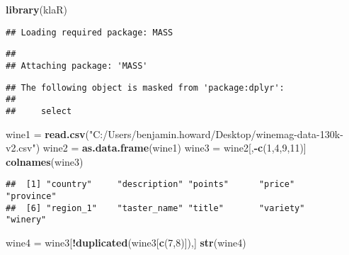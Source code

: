 \documentclass[
]{article}
\newenvironment{Shaded}{\begin{snugshade}}{\end{snugshade}}
\newcommand{\DecValTok}[1]{\textcolor[rgb]{0.00,0.00,0.81}{#1}}
\newcommand{\KeywordTok}[1]{\textcolor[rgb]{0.13,0.29,0.53}{\textbf{#1}}}
\newcommand{\NormalTok}[1]{#1}
\newcommand{\OperatorTok}[1]{\textcolor[rgb]{0.81,0.36,0.00}{\textbf{#1}}}
\newcommand{\StringTok}[1]{\textcolor[rgb]{0.31,0.60,0.02}{#1}}
\begin{document}
\begin{Shaded}
\begin{Highlighting}[]
\KeywordTok{library}\NormalTok{(klaR)}
\end{Highlighting}
\end{Shaded}

\begin{verbatim}
## Loading required package: MASS
\end{verbatim}

\begin{verbatim}
## 
## Attaching package: 'MASS'
\end{verbatim}

\begin{verbatim}
## The following object is masked from 'package:dplyr':
## 
##     select
\end{verbatim}

\begin{Shaded}
\begin{Highlighting}[]
\NormalTok{wine1 =}\StringTok{ }\KeywordTok{read.csv}\NormalTok{(}\StringTok{"C:/Users/benjamin.howard/Desktop/winemag-data-130k-v2.csv"}\NormalTok{)}
\NormalTok{wine2 =}\StringTok{ }\KeywordTok{as.data.frame}\NormalTok{(wine1)}
\NormalTok{wine3 =}\StringTok{ }\NormalTok{wine2[,}\OperatorTok{-}\KeywordTok{c}\NormalTok{(}\DecValTok{1}\NormalTok{,}\DecValTok{4}\NormalTok{,}\DecValTok{9}\NormalTok{,}\DecValTok{11}\NormalTok{)]}
\KeywordTok{colnames}\NormalTok{(wine3)}
\end{Highlighting}
\end{Shaded}

\begin{verbatim}
##  [1] "country"     "description" "points"      "price"       "province"   
##  [6] "region_1"    "taster_name" "title"       "variety"     "winery"
\end{verbatim}

\begin{Shaded}
\begin{Highlighting}[]
\NormalTok{wine4 =}\StringTok{ }\NormalTok{wine3[}\OperatorTok{!}\KeywordTok{duplicated}\NormalTok{(wine3[}\KeywordTok{c}\NormalTok{(}\DecValTok{7}\NormalTok{,}\DecValTok{8}\NormalTok{)]),]}
\KeywordTok{str}\NormalTok{(wine4)}
\end{Highlighting}
\end{Shaded}
\end{document}
